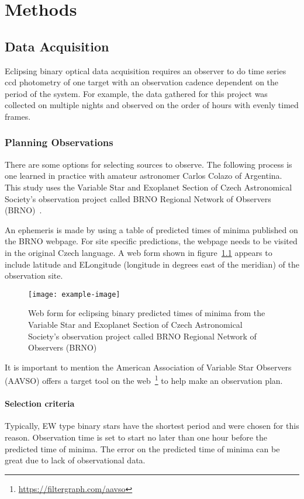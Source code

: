 \chapter{Methods}
\label{chp:data}

\section{Data Acquisition}
Eclipsing binary optical data acquisition requires an observer to do time series ccd photometry
of one target with an observation cadence dependent on the period of the system.
For example, the data gathered for this project was collected on multiple nights and observed on the order of hours with evenly timed frames.

\subsection{Planning Observations}
There are some options for selecting sources to observe.
The following process is one learned in practice with amateur astronomer Carlos Colazo of Argentina.
This study uses the Variable Star and Exoplanet Section of Czech Astronomical Society's observation project called
BRNO Regional Network of Observers (BRNO)~\cite{brno}.

An ephemeris is made by using a table of predicted times of minima published on the BRNO webpage.
For site specific predictions, the webpage needs to be visited in the original Czech language.
A web form shown in figure~\ref{fig:brno} appears to include latitude and ELongitude (longitude in degrees east of the meridian) of the observation site.
\begin{figure}[h]
    \centering
    \texttt{[image: example-image]}%
    \caption{Web form for eclipsing binary predicted times of minima from the Variable Star and Exoplanet Section of Czech Astronomical Society's observation project called BRNO Regional Network of Observers (BRNO)}
\label{fig:brno}
\end{figure}

It is important to mention the American Association of Variable Star Observers (AAVSO)
offers a target tool on the web~\footnote{\url{https://filtergraph.com/aavso}} to help make an observation plan.


\subsubsection{Selection criteria}
Typically, EW type binary stars have the shortest period and were chosen for this reason. 
Observation time is set to start no later than one hour before the predicted time of minima.
The error on the predicted time of minima can be great due to lack of observational data.


